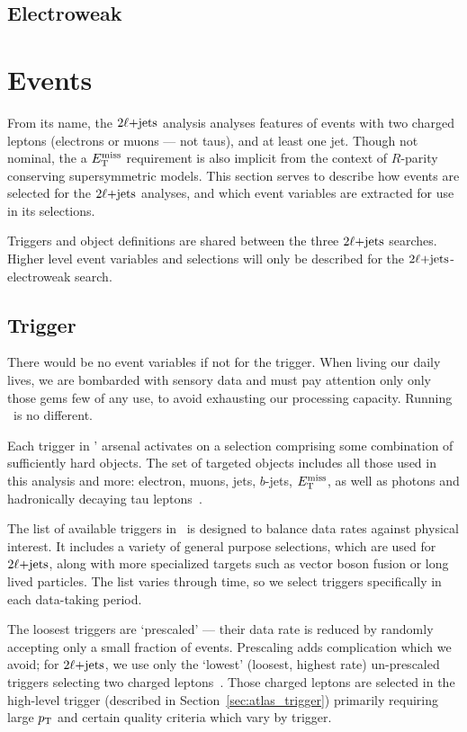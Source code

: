 \subsection{Electroweak}
\label{sec:2ljets_origins_electroweak}

\section{Events}
From its name, the $2\ell\mathrm{+jets}$ analysis analyses features of events with two
charged leptons (electrons or muons --- not taus), and at least one jet.
Though not nominal, the a $E_\mathrm{T}^\mathrm{miss}$ requirement is also implicit from the context
of $R$-parity conserving supersymmetric models.
This section serves to describe how events are selected for the $2\ell\mathrm{+jets}$
analyses, and which event variables are extracted for use in its selections.

Triggers and object definitions are shared between the three $2\ell\mathrm{+jets}$
searches.
Higher level event variables and selections will only be described for the
$2\ell\mathrm{+jets}$-electroweak search.


\subsection{Trigger}
\label{sec:2ljets_trigger}
There would be no event variables if not for the trigger.
When living our daily lives, we are bombarded with sensory data and must pay
attention only only those gems few of any use, to avoid exhausting our
processing capacity.
Running \atlas\ is no different.

Each trigger in \atlas' arsenal activates on a selection comprising some
combination of sufficiently hard objects.
The set of targeted objects includes all those used in this analysis and more:
electron, muons, jets, $b$-jets, $E_\mathrm{T}^\mathrm{miss}$, as well as photons and hadronically
decaying tau leptons~\cite{atlas_PERF_2007_01}.

The list of available triggers in \atlas\ is designed to balance data rates
against physical interest.
It includes a variety of general purpose selections, which are used for
$2\ell\mathrm{+jets}$, along with more specialized targets such as vector boson fusion
or long lived particles.
The list varies through time, so we select triggers specifically in
each data-taking period.

The loosest triggers are `prescaled' --- their data rate is reduced by randomly
accepting only a small fraction of events.
Prescaling adds complication which we avoid;
for $2\ell\mathrm{+jets}$, we use only the `lowest' (loosest, highest rate) un-prescaled
triggers selecting two charged leptons~\cite{atlas_twiki_lowest_unprescaled}.
Those charged leptons are selected in the
high-level trigger (described in Section~\ref{sec:atlas_trigger})
primarily requiring large $p_\mathrm{T}$ and certain quality criteria which vary by
trigger.

